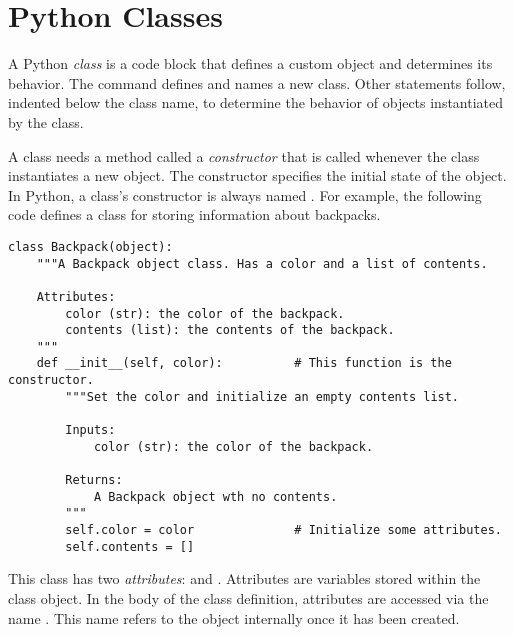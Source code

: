 \label{lab:OOP}


\section*{Python Classes}

A Python \emph{class} is a code block that defines a custom object and determines its behavior.
The  command defines and names a new class.
Other statements follow, indented below the class name, to determine the behavior of objects instantiated by the class.

A class needs a method called a \emph{constructor} that is called whenever the class instantiates a new object.
The constructor specifies the initial state of the object.
In Python, a class's constructor is always named .
For example, the following code defines a class for storing information about backpacks.

\begin{lstlisting}
class Backpack(object):
    """A Backpack object class. Has a color and a list of contents.
    
    Attributes:
        color (str): the color of the backpack.
        contents (list): the contents of the backpack.
    """
    def __init__(self, color):          # This function is the constructor.
        """Set the color and initialize an empty contents list.
        
        Inputs:
            color (str): the color of the backpack.
        
        Returns:
            A Backpack object wth no contents.
        """ 
        self.color = color              # Initialize some attributes.
        self.contents = []
\end{lstlisting}

This  class has two \emph{attributes}:  and .
Attributes are variables stored within the class object.
In the body of the class definition, attributes are accessed via the name .
This name refers to the object internally once it has been created.

